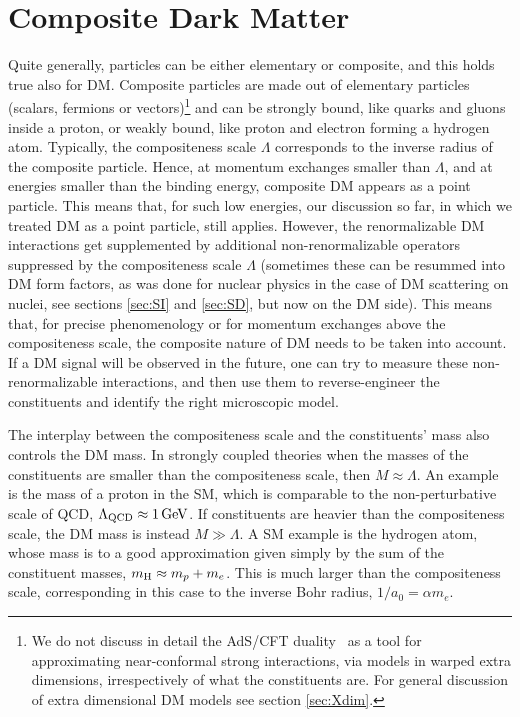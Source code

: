 \section{Composite Dark Matter}
\label{sec:compositeDM}
Quite generally, particles can be either elementary or composite, and this holds true also for DM. Composite particles are made out of elementary particles (scalars, fermions or vectors)\footnote{We do not
discuss in detail the AdS/CFT duality~\cite{AdS/CFT} as a tool
for approximating near-conformal strong interactions, via models in
warped extra dimensions, irrespectively of what the constituents are. 
For general discussion of extra dimensional DM models see section \ref{sec:Xdim}.}
 and can be strongly bound, like quarks and gluons inside a proton, or weakly bound, like proton and electron forming a hydrogen atom. 
 Typically, the compositeness scale $\Lambda$ corresponds to the inverse radius of the composite particle.
 Hence, at momentum exchanges smaller than $\Lambda$, and at energies smaller than the binding energy, composite DM appears as a point particle. 
This means that, for such low energies, our discussion so far, in which we treated DM as a point particle, still applies.  However, the renormalizable DM interactions get supplemented by additional 
non-renormalizable operators suppressed by the compositeness scale $\Lambda$ (sometimes these can be resummed into DM form factors, as was done for nuclear physics in the case of DM scattering on nuclei, see sections \ref{sec:SI} and \ref{sec:SD}, but now on the DM side). This means that, for precise phenomenology or for momentum exchanges above the compositeness scale, the composite nature of DM needs to be taken into account. 
If a DM signal will be observed in the future, one can try to measure these non-renormalizable interactions, and then use them  
to reverse-engineer the constituents and identify the right microscopic model.

The interplay between the compositeness scale and the constituents' mass also controls the DM mass. 
In strongly coupled theories when the masses of the constituents are smaller than the compositeness scale, then $M\approx \Lambda$. An example is the mass of a proton in the SM, which is comparable to the non-perturbative scale of QCD, $\Lambda_{\rm QCD}\approx 1\,{\rm GeV}$. 
If constituents are heavier than the compositeness scale, the DM mass is instead $M \gg \Lambda$. 
A SM example is the hydrogen atom, whose mass is to a good approximation given simply by the sum of the constituent masses, $m_{\rm H}\approx m_p+m_e$. This is much larger than the compositeness scale, corresponding in this case to the inverse Bohr radius, $1/a_0 = \alpha m_e$.

